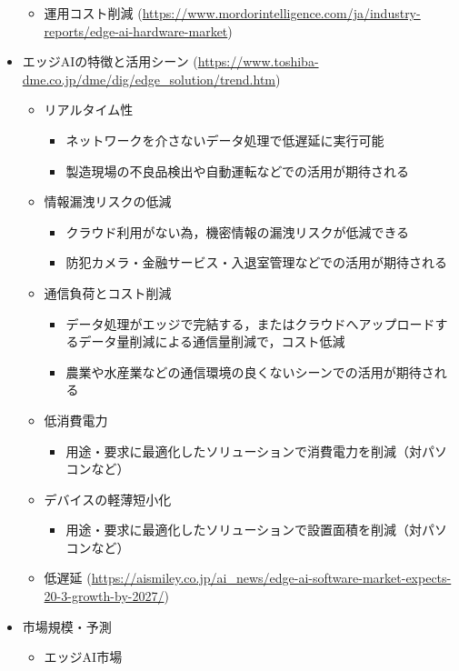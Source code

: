 \begin{itemize}
\begin{itemize}
		\item 運用コスト削減 (\url{https://www.mordorintelligence.com/ja/industry-reports/edge-ai-hardware-market})
	\end{itemize}
	\item エッジAIの特徴と活用シーン (\url{https://www.toshiba-dme.co.jp/dme/dig/edge_solution/trend.htm})
	\begin{itemize}
		\item リアルタイム性
		\begin{itemize}
			\item ネットワークを介さないデータ処理で低遅延に実行可能
			\item 製造現場の不良品検出や自動運転などでの活用が期待される
		\end{itemize}
		\item 情報漏洩リスクの低減
		\begin{itemize}
			\item クラウド利用がない為，機密情報の漏洩リスクが低減できる
			\item 防犯カメラ・金融サービス・入退室管理などでの活用が期待される
		\end{itemize}
		\item 通信負荷とコスト削減
		\begin{itemize}
			\item データ処理がエッジで完結する，またはクラウドへアップロードするデータ量削減による通信量削減で，コスト低減
			\item 農業や水産業などの通信環境の良くないシーンでの活用が期待される
		\end{itemize}
		\item 低消費電力
		\begin{itemize}
			\item 用途・要求に最適化したソリューションで消費電力を削減（対パソコンなど）
		\end{itemize}
		\item デバイスの軽薄短小化
		\begin{itemize}
			\item 用途・要求に最適化したソリューションで設置面積を削減（対パソコンなど）
		\end{itemize}
		\item 低遅延 (\url{https://aismiley.co.jp/ai_news/edge-ai-software-market-expects-20-3-growth-by-2027/})
	\end{itemize}
	\item 市場規模・予測
	\begin{itemize}
		\item エッジAI市場

\end{itemize}
\end{itemize}
